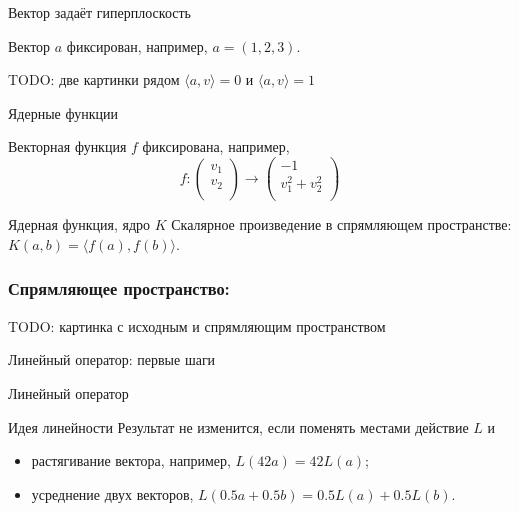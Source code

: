 \documentclass[14pt,xcolor=dvipsnames]{beamer}
\begin{document}
\begin{frame}{Вектор задаёт гиперплоскость}

Вектор $a$ фиксирован, например, $a=(1, 2, 3)$.

\begin{block}{TODO: две картинки рядом}
$\langle a, v \rangle = 0$ и $\langle a, v \rangle = 1$   
\end{block}


\end{frame}


\begin{frame}{Ядерные функции}

Векторная функция $f$ фиксирована, например, 
\[
  f : \begin{pmatrix}
    v_1 \\
    v_2 \\
  \end{pmatrix} \to 
  \begin{pmatrix}
    -1 \\
    v_1^2 + v_2^2 \\
  \end{pmatrix}
\]

\begin{block}{Ядерная функция, ядро $K$}
Скалярное произведение в спрямляющем пространстве:
$K(a, b) = \langle f(a), f(b) \rangle$.
\end{block}
\end{frame}

\begin{frame}
  \frametitle{Спрямляющее пространство:}

\begin{block}{TODO: картинка с исходным и спрямляющим пространством} 
  
\end{block}
  

\end{frame}


\begin{frame}
  
  Линейный оператор: первые шаги

\end{frame}


\begin{frame}{Линейный оператор}


\begin{block}{Идея линейности}
  Результат не изменится, если поменять местами действие $L$ и
  \begin{itemize}
    \item растягивание вектора, например, $L(42a)=42L(a)$;
    \item усреднение двух векторов, $L(0.5a+0.5b)=0.5L(a) + 0.5L(b)$.
  \end{itemize}
\end{block}

\end{frame}
\end{document}

